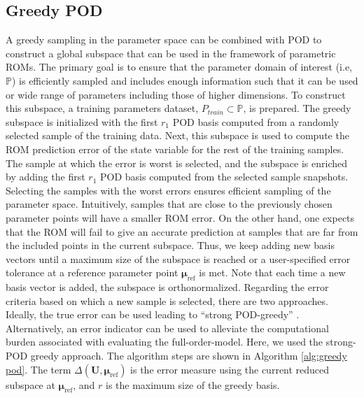 \documentclass[]{interact}
\theoremstyle{plain}%
\theoremstyle{definition}
\theoremstyle{remark}
\begin{document}
\subsection{Greedy POD}
A greedy sampling in the parameter space \cite{nguyen2009reduced} can be combined with POD to construct a global subspace that can be used in the framework of parametric ROMs.
The primary goal is to ensure that the parameter domain of interest (i.e, $\mathbb P$) is efficiently sampled and includes enough information such that it can be used or wide range of parameters including those of higher dimensions.
To construct this subspace, a training parameters dataset, $P_{train} \subset \mathbb P$, is prepared. 
The greedy subspace is initialized with the first $r_1$ POD basis computed from a randomly selected sample of the training data.
Next, this subspace is used to compute the ROM prediction error of the state variable for the rest of the training samples.
The sample at which the error is worst is selected, and the subspace is enriched by adding the first $r_1$ POD basis computed from the selected sample snapshots.
Selecting the samples with the worst errors ensures efficient sampling of the parameter space.
Intuitively, samples that are close to the previously chosen parameter points will have a smaller ROM error.
On the other hand, one expects that the ROM will fail to give an accurate prediction at samples that are far from the included points in the current subspace.
Thus, we keep adding new basis vectors until a maximum size of the subspace is reached or a user-specified error tolerance at a reference parameter point $\boldsymbol{\mu}_{\text{ref}}$ is met.
Note that each time a new basis vector is added, the subspace is orthonormalized.
Regarding the error criteria based on which a new sample is selected, there are two approaches. 
Ideally, the true error can be used leading to ``strong POD-greedy'' \cite{benner2017model}.
Alternatively, an error indicator can be used to alleviate the computational burden associated with evaluating the full-order-model. 
Here, we used the strong-POD greedy approach. 
The algorithm steps are shown in Algorithm \ref{alg:greedy pod}. 
The term $\Delta(\textbf{U},\boldsymbol{\mu}_\text{ref})$  is the error measure using the current reduced subspace at $\boldsymbol{\mu}_\text{ref}$, and $r$ is the maximum size of the greedy basis.
\end{document}
